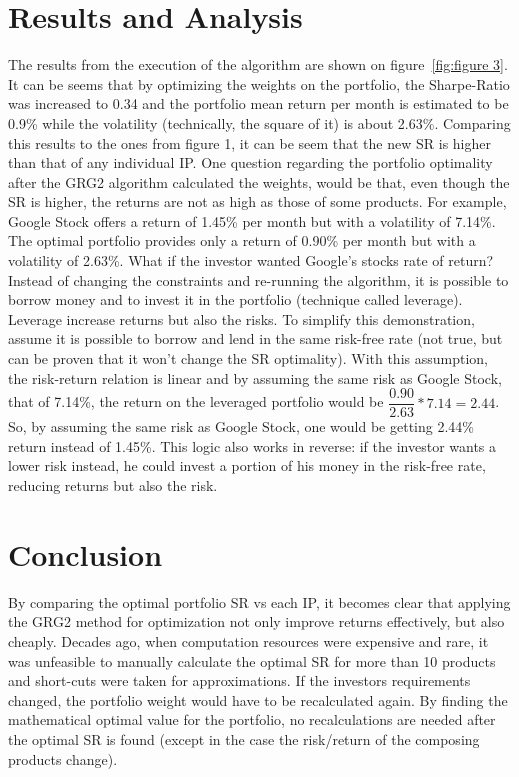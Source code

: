 \documentclass[a4paper,man,natbib]{apa6}
\begin{document}
	\section{Results and Analysis}
	The results from the execution of the algorithm are shown on figure~\ref{fig:figure 3}. It can be seems that by optimizing the weights on the portfolio, the Sharpe-Ratio was increased to 0.34 and the portfolio mean return per month is estimated to be 0.9\% while the volatility (technically, the square of it) is about 2.63\%. Comparing this results to the ones from figure 1, it can be seem that the new SR is higher than that of any individual IP.
	One question regarding the portfolio optimality after the GRG2 algorithm calculated the weights, would be that, even though the SR is higher, the returns are not as high as those of some products. For example, Google Stock offers a return of 1.45\% per month but with a volatility of 7.14\%. The optimal portfolio provides only a return of 0.90\% per month but with a volatility of 2.63\%. What if the investor wanted Google's stocks rate of return? Instead of changing the constraints and re-running the algorithm, it is possible to borrow money and to invest it in the portfolio (technique called leverage). Leverage increase returns but also the risks. To simplify this demonstration, assume it is possible to borrow and lend in the same risk-free rate (not true, but can be proven that it won't change the SR optimality). With this assumption, the risk-return relation is linear and by assuming the same risk as Google Stock, that of 7.14\%, the return on the leveraged portfolio would be $\dfrac{0.90}{2.63} * 7.14 = 2.44$. So, by assuming the same risk as Google Stock, one would be getting 2.44\% return instead of 1.45\%. This logic also works in reverse: if the investor wants a lower risk instead, he could invest a portion of his money in the risk-free rate, reducing returns but also the risk. 

	\section{Conclusion}
	By comparing the optimal portfolio SR vs each IP, it becomes clear that applying the GRG2 method for optimization not only improve returns effectively, but also cheaply. Decades ago, when computation resources were expensive and rare, it was unfeasible to manually calculate the optimal SR for more than 10 products and short-cuts were taken for approximations. If the investors requirements changed, the portfolio weight would have to be recalculated again. By finding the mathematical optimal value for the portfolio, no recalculations are needed after the optimal SR is found (except in the case the risk/return of the composing products change).
	
\end{document}
